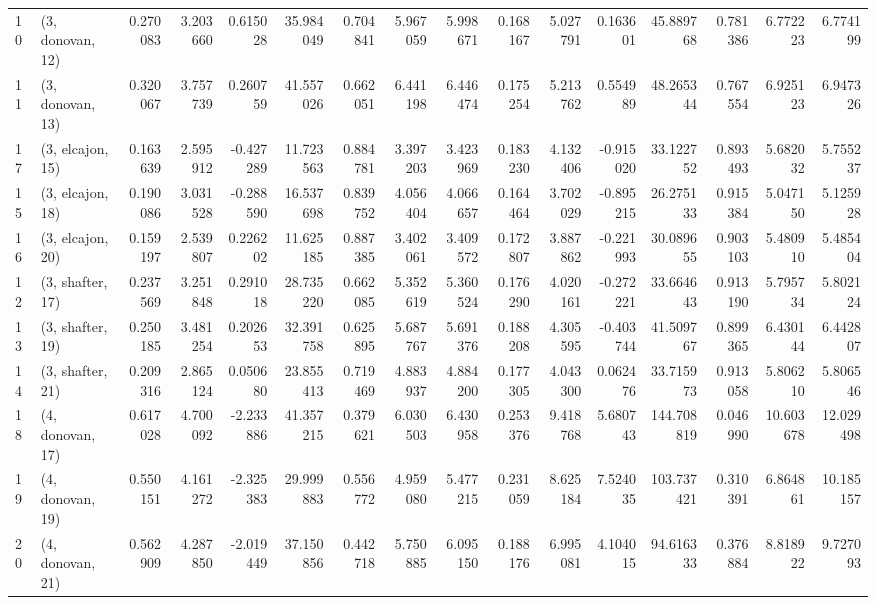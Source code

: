\begin{tabular}{llrrrrrrrrrrrrrr}
10 &  (3, donovan, 12) &   0.270083 &  3.203660 &  0.615028 &  35.984049 &  0.704841 &   5.967059 &  5.998671 &  0.168167 &  5.027791 &  0.163601 &   45.889768 &  0.781386 &   6.772223 &   6.774199 \\
11 &  (3, donovan, 13) &   0.320067 &  3.757739 &  0.260759 &  41.557026 &  0.662051 &   6.441198 &  6.446474 &  0.175254 &  5.213762 &  0.554989 &   48.265344 &  0.767554 &   6.925123 &   6.947326 \\
17 &  (3, elcajon, 15) &   0.163639 &  2.595912 & -0.427289 &  11.723563 &  0.884781 &   3.397203 &  3.423969 &  0.183230 &  4.132406 & -0.915020 &   33.122752 &  0.893493 &   5.682032 &   5.755237 \\
15 &  (3, elcajon, 18) &   0.190086 &  3.031528 & -0.288590 &  16.537698 &  0.839752 &   4.056404 &  4.066657 &  0.164464 &  3.702029 & -0.895215 &   26.275133 &  0.915384 &   5.047150 &   5.125928 \\
16 &  (3, elcajon, 20) &   0.159197 &  2.539807 &  0.226202 &  11.625185 &  0.887385 &   3.402061 &  3.409572 &  0.172807 &  3.887862 & -0.221993 &   30.089655 &  0.903103 &   5.480910 &   5.485404 \\
12 &  (3, shafter, 17) &   0.237569 &  3.251848 &  0.291018 &  28.735220 &  0.662085 &   5.352619 &  5.360524 &  0.176290 &  4.020161 & -0.272221 &   33.664643 &  0.913190 &   5.795734 &   5.802124 \\
13 &  (3, shafter, 19) &   0.250185 &  3.481254 &  0.202653 &  32.391758 &  0.625895 &   5.687767 &  5.691376 &  0.188208 &  4.305595 & -0.403744 &   41.509767 &  0.899365 &   6.430144 &   6.442807 \\
14 &  (3, shafter, 21) &   0.209316 &  2.865124 &  0.050680 &  23.855413 &  0.719469 &   4.883937 &  4.884200 &  0.177305 &  4.043300 &  0.062476 &   33.715973 &  0.913058 &   5.806210 &   5.806546 \\
18 &  (4, donovan, 17) &   0.617028 &  4.700092 & -2.233886 &  41.357215 &  0.379621 &   6.030503 &  6.430958 &  0.253376 &  9.418768 &  5.680743 &  144.708819 &  0.046990 &  10.603678 &  12.029498 \\
19 &  (4, donovan, 19) &   0.550151 &  4.161272 & -2.325383 &  29.999883 &  0.556772 &   4.959080 &  5.477215 &  0.231059 &  8.625184 &  7.524035 &  103.737421 &  0.310391 &   6.864861 &  10.185157 \\
20 &  (4, donovan, 21) &   0.562909 &  4.287850 & -2.019449 &  37.150856 &  0.442718 &   5.750885 &  6.095150 &  0.188176 &  6.995081 &  4.104015 &   94.616333 &  0.376884 &   8.818922 &   9.727093 \\

\end{tabular}
